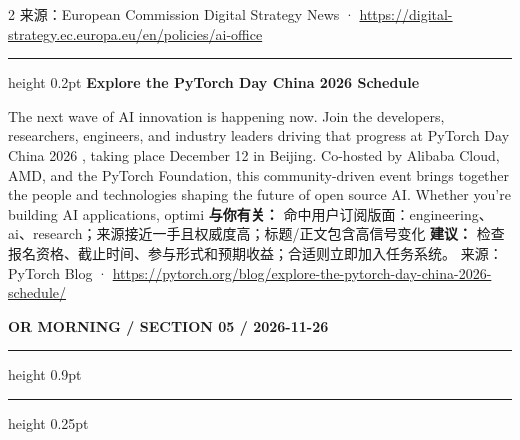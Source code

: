 \documentclass[10.5pt]{ctexart}
\begin{document}
\begin{multicols}{2}
{\footnotesize\color{ormuted} 来源：European Commission Digital Strategy News · \url{https://digital-strategy.ec.europa.eu/en/policies/ai-office}}
\vspace{2mm}
\hrule height 0.2pt
\vspace{2mm}
{\large\bfseries Explore the PyTorch Day China 2026 Schedule}\par
The next wave of AI innovation is happening now. Join the developers, researchers, engineers, and industry leaders driving that progress at PyTorch Day China 2026 , taking place December 12 in Beijing. Co-hosted by Alibaba Cloud, AMD, and the PyTorch Foundation, this community-driven event brings together the people and technologies shaping the future of open source AI. Whether you’re building AI applications, optimi
\textbf{与你有关：} 命中用户订阅版面：engineering、ai、research；来源接近一手且权威度高；标题/正文包含高信号变化
\textbf{建议：} 检查报名资格、截止时间、参与形式和预期收益；合适则立即加入任务系统。
{\footnotesize\color{ormuted} 来源：PyTorch Blog · \url{https://pytorch.org/blog/explore-the-pytorch-day-china-2026-schedule/}}
\end{multicols}
\newpage
{\small\bfseries OR MORNING / SECTION 05 / 2026-11-26}
\vspace{2mm}
\hrule height 0.9pt
\vspace{1.5mm}
\hrule height 0.25pt
\vspace{4mm}
\end{document}
